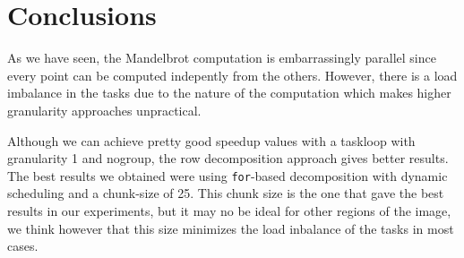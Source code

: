 \section{Conclusions}%
\label{sec:Conclusions}

As we have seen, the Mandelbrot computation is embarrassingly parallel since every point can be computed indepently
from the others. However, there is a load imbalance in the tasks due to the nature of the computation which makes
higher granularity approaches unpractical.

Although we can achieve pretty good speedup values with a taskloop with granularity 1 and nogroup, the row
decomposition approach gives better results. The best results we obtained were using \texttt{for}-based decomposition
with dynamic scheduling and a chunk-size of 25. This chunk size is the one that gave the best results in our
experiments, but it may no be ideal for other regions of the image, we think however that this size minimizes
the load inbalance of the tasks in most cases.







